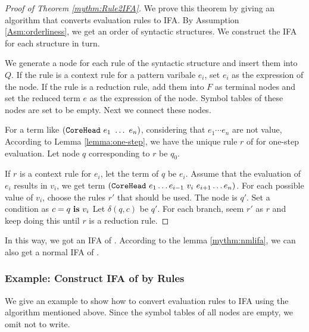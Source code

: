\begin{proof}[Proof of Theorem \ref{mythm:Rule2IFA}]

We prove this theorem by giving an algorithm that converts evaluation rules to IFA. By Assumption \ref{Asm:orderliness}, we get an order of syntactic structures. We construct the IFA for each structure in turn.

We generate a node for each rule of the syntactic structure  and insert them into $Q$. If the rule is a context rule for a pattern varibale $e_i$, set $e_i$ as the expression of the node. If the rule is a reduction rule, add them into $F$ as terminal nodes and set the reduced term $e$ as the expression of the node. Symbol tables of these nodes are set to be empty. Next we connect these nodes.

For a term like $(\mbox{\tt CoreHead}~e_1~\ldots~e_n)$, considering that $e_1\cdots e_n$ are not value, According to Lemma \ref{lemma:one-step}, we have the unique rule $r$ of  for one-step evaluation. Let node $q$ corresponding to $r$ be $q_0$.

If $r$ is a context rule for $e_i$, let the term of $q$ be $e_i$. Assume that the evaluation of $e_i$ results in $v_i$, we get term $(\mbox{\tt CoreHead}~e_1 \ldots e_{i-1}~v_i~e_{i+1} \ldots e_n)$. For each possible value of $v_i$, choose the rules $r'$ that should be used. The node is $q'$. Set a condition as $c=q~\mbox{\rm \bf is}~v_i$ Let $\delta(q, c)$ be $q'$. For each branch, seem $r'$ as $r$ and keep doing this until $r$ is a reduction rule.
\end{proof}

In this way, we got an IFA of . According to the lemma \ref{mythm:nmlifa}, we can also get a normal IFA of . 

\subsubsection{Example: Construct IFA of  by Rules}

We give an example to show how to convert evaluation rules to IFA using the algorithm mentioned above. Since the symbol tables of all nodes are empty, we omit not to write.


